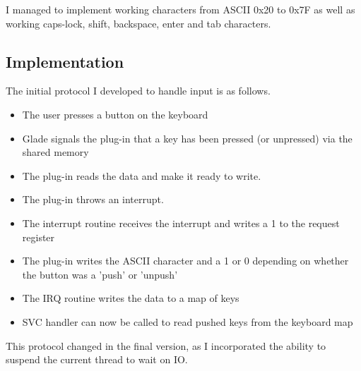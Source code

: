 I managed to implement working characters from ASCII 0x20 to 0x7F as well as working caps-lock, shift, backspace, enter and tab characters. 



\subsection{Implementation}
The initial protocol I developed to handle input is as follows.

\begin{itemize}
	\item The user presses a button on the keyboard
	\item Glade signals the plug-in that a key has been pressed (or unpressed) via the shared memory
	\item The plug-in reads the data and make it ready to write.
	\item The plug-in throws an interrupt.
	\item The interrupt routine receives the interrupt and writes a 1 to the request register
	\item The plug-in writes the ASCII character and a 1 or 0 depending on whether the button was a 'push' or 'unpush'
	\item The IRQ routine writes the data to a map of keys
	\item SVC handler can now be called to read pushed keys from the keyboard map
\end{itemize}

This protocol changed in the final version, as I incorporated the ability to suspend the current thread to wait on IO.




















